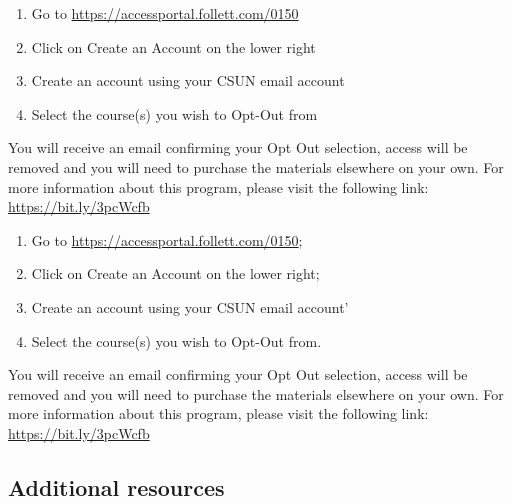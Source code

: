 \documentclass[
  letterpaper,
  DIV=11,
  numbers=noendperiod,
  oneside]{scrartcl}
\providecommand{\tightlist}{%
  \setlength{\itemsep}{0pt}\setlength{\parskip}{0pt}}\usepackage{longtable,booktabs,array}
\begin{document}
\begin{enumerate}
\def\labelenumi{\arabic{enumi}.}
\tightlist
\item
  Go to \url{https://accessportal.follett.com/0150}
\item
  Click on Create an Account on the lower right
\item
  Create an account using your CSUN email account
\item
  Select the course(s) you wish to Opt-Out from
\end{enumerate}

You will receive an email confirming your Opt Out selection, access will
be removed and you will need to purchase the materials elsewhere on your
own. For more information about this program, please visit the following
link: \url{https://bit.ly/3pcWcfb}

\begin{enumerate}
\def\labelenumi{\arabic{enumi}.}
\tightlist
\item
  Go to \url{https://accessportal.follett.com/0150};
\item
  Click on Create an Account on the lower right;
\item
  Create an account using your CSUN email account'
\item
  Select the course(s) you wish to Opt-Out from.
\end{enumerate}

\begin{tcolorbox}[enhanced jigsaw, breakable, colbacktitle=quarto-callout-note-color!10!white, colframe=quarto-callout-note-color-frame, opacitybacktitle=0.6, title=\textcolor{quarto-callout-note-color}{\faInfo}\hspace{0.5em}{Note}, opacityback=0, colback=white, bottomrule=.15mm, toprule=.15mm, left=2mm, rightrule=.15mm, toptitle=1mm, titlerule=0mm, arc=.35mm, bottomtitle=1mm, leftrule=.75mm, coltitle=black]
You will receive an email confirming your Opt Out selection, access will
be removed and you will need to purchase the materials elsewhere on your
own. For more information about this program, please visit the following
link: \url{https://bit.ly/3pcWcfb}
\end{tcolorbox}

\hypertarget{additional-resources}{%
\subsection{Additional resources}\label{additional-resources}}
\end{document}
